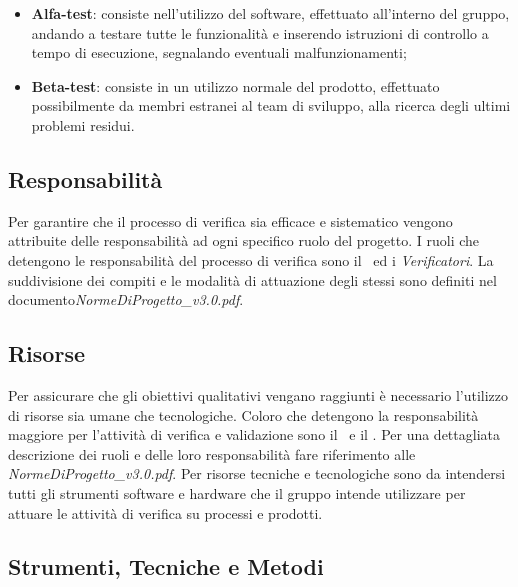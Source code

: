 \begin{itemize}
	\item \textbf{Alfa-test}: consiste nell'utilizzo del software, effettuato all'interno del gruppo, andando a testare tutte le funzionalità e inserendo istruzioni di controllo a tempo di esecuzione, segnalando eventuali malfunzionamenti;
	\item \textbf{Beta-test}: consiste in un utilizzo normale del prodotto, effettuato possibilmente da membri estranei al team di sviluppo, alla ricerca degli ultimi problemi residui.
\end{itemize}

\subsection{Responsabilità}
Per garantire che il processo di verifica sia efficace e sistematico vengono attribuite delle responsabilità ad ogni specifico ruolo del progetto. I ruoli che detengono le responsabilità del processo di verifica sono il \ruoloResponsabile\ ed i {\textit{Verificatori}}. La suddivisione dei compiti e le modalità di attuazione degli stessi sono definiti nel documento\textit{NormeDiProgetto\_v3.0.pdf}.

\subsection{Risorse}
Per assicurare che gli obiettivi qualitativi vengano raggiunti è necessario l'utilizzo di risorse sia umane che tecnologiche. Coloro che detengono la responsabilità maggiore per l'attività di verifica e validazione sono il \ruoloResponsabile\ e il \ruoloVerificatore. Per una dettagliata descrizione dei ruoli e delle loro responsabilità fare riferimento alle \textit{NormeDiProgetto_v3.0.pdf}. Per risorse tecniche e tecnologiche sono da intendersi tutti gli strumenti software e hardware che il gruppo intende utilizzare per attuare le attività di verifica su processi e prodotti.

\subsection{Strumenti, Tecniche e Metodi}
